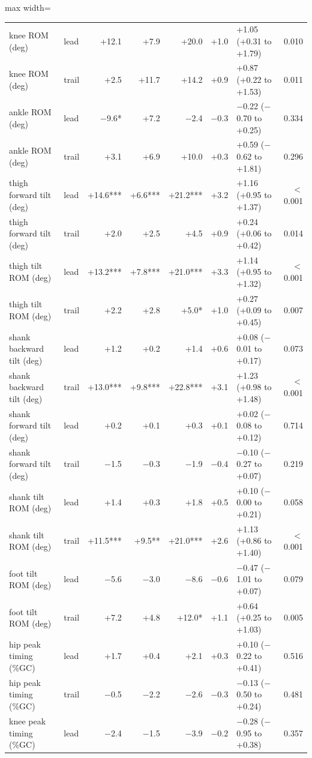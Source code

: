 \begin{adjustbox}{max width=\textwidth}
{\begin{tabular}{llrrrrlr}
knee ROM (deg) & lead & +12.1 & +7.9 & +20.0 & +1.0 & +1.05 (+0.31 to +1.79) & 0.010 \\
knee ROM (deg) & trail & +2.5 & +11.7 & +14.2 & +0.9 & +0.87 (+0.22 to +1.53) & 0.011 \\
ankle ROM (deg) & lead & $-$9.6* & +7.2 & $-$2.4 & $-$0.3 & $-$0.22 ($-$0.70 to +0.25) & 0.334 \\
ankle ROM (deg) & trail & +3.1 & +6.9 & +10.0 & +0.3 & +0.59 ($-$0.62 to +1.81) & 0.296 \\
thigh forward tilt (deg) & lead & +14.6*** & +6.6*** & +21.2*** & +3.2 & +1.16 (+0.95 to +1.37) & $<$0.001 \\
thigh forward tilt (deg) & trail & +2.0 & +2.5 & +4.5 & +0.9 & +0.24 (+0.06 to +0.42) & 0.014 \\
thigh tilt ROM (deg) & lead & +13.2*** & +7.8*** & +21.0*** & +3.3 & +1.14 (+0.95 to +1.32) & $<$0.001 \\
thigh tilt ROM (deg) & trail & +2.2 & +2.8 & +5.0* & +1.0 & +0.27 (+0.09 to +0.45) & 0.007 \\
shank backward tilt (deg) & lead & +1.2 & +0.2 & +1.4 & +0.6 & +0.08 ($-$0.01 to +0.17) & 0.073 \\
shank backward tilt (deg) & trail & +13.0*** & +9.8*** & +22.8*** & +3.1 & +1.23 (+0.98 to +1.48) & $<$0.001 \\
shank forward tilt (deg) & lead & +0.2 & +0.1 & +0.3 & +0.1 & +0.02 ($-$0.08 to +0.12) & 0.714 \\
shank forward tilt (deg) & trail & $-$1.5 & $-$0.3 & $-$1.9 & $-$0.4 & $-$0.10 ($-$0.27 to +0.07) & 0.219 \\
shank tilt ROM (deg) & lead & +1.4 & +0.3 & +1.8 & +0.5 & +0.10 ($-$0.00 to +0.21) & 0.058 \\
shank tilt ROM (deg) & trail & +11.5*** & +9.5** & +21.0*** & +2.6 & +1.13 (+0.86 to +1.40) & $<$0.001 \\
foot tilt ROM (deg) & lead & $-$5.6 & $-$3.0 & $-$8.6 & $-$0.6 & $-$0.47 ($-$1.01 to +0.07) & 0.079 \\
foot tilt ROM (deg) & trail & +7.2 & +4.8 & +12.0* & +1.1 & +0.64 (+0.25 to +1.03) & 0.005 \\
hip peak timing (\%GC) & lead & +1.7 & +0.4 & +2.1 & +0.3 & +0.10 ($-$0.22 to +0.41) & 0.516 \\
hip peak timing (\%GC) & trail & $-$0.5 & $-$2.2 & $-$2.6 & $-$0.3 & $-$0.13 ($-$0.50 to +0.24) & 0.481 \\
knee peak timing (\%GC) & lead & $-$2.4 & $-$1.5 & $-$3.9 & $-$0.2 & $-$0.28 ($-$0.95 to +0.38) & 0.357 \\

\end{tabular}}
\end{adjustbox}
